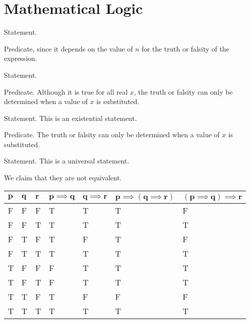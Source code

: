 \section{Mathematical Logic}
\begin{questions}
    \item \begin{partquestions}{\alph*}
        \item Statement.
        \item Predicate, since it depends on the value of $n$ for the truth or falsity of the expression.
        \item Statement.
        \item Predicate. Although it is true for all real $x$, the truth or falsity can only be determined when a value of $x$ is substituted.
        \item Statement. This is an existential statement.
        \item Predicate. The truth or falsity can only be determined when a value of $x$ is substituted.
        \item Statement. This is a universal statement.
    \end{partquestions}

    \item \begin{partquestions}{\alph*}
        \item We claim that they are not equivalent.
        \begin{table}[h]
            \centering
            \begin{tabular}{|l|l|l||l|l||l|l|}
                \hline
                $\boldsymbol{p}$ & $\boldsymbol{q}$ & $\boldsymbol{r}$ & $\boldsymbol{p \implies q}$ & $\boldsymbol{q \implies r}$ & $\boldsymbol{p \implies (q \implies r)}$ & $\boldsymbol{(p \implies q) \implies r}$ \\ \hline
                F & F & F & T & T & T & F \\ \hline
                F & F & T & T & T & T & T \\ \hline
                F & T & F & T & F & T & F \\ \hline
                F & T & T & T & T & T & T \\ \hline
                T & F & F & F & T & T & T \\ \hline
                T & F & T & F & T & T & T \\ \hline
                T & T & F & T & F & F & F \\ \hline
                T & T & T & T & T & T & T \\ \hline
            \end{tabular}
        \end{table}


\end{partquestions}
\end{questions}
